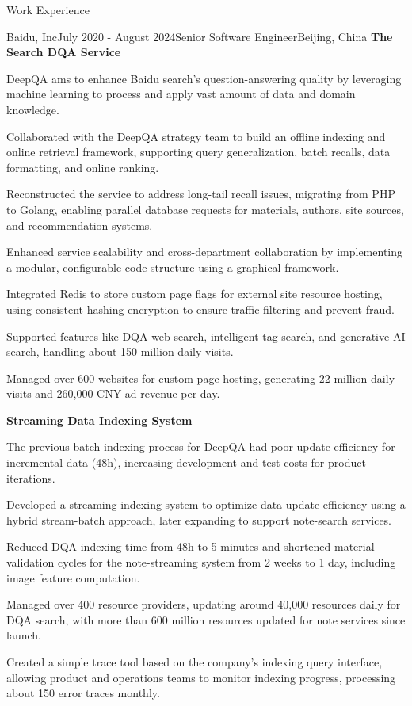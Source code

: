 \documentclass[
	11pt, %
]{resume} %
\begin{document}
\begin{rSection}{Work Experience}
\begin{rSubsection}{Baidu, Inc}{July 2020 - August 2024}{Senior Software Engineer}{Beijing, China}
    \textbf{The Search DQA Service}
        \item DeepQA ams to enhance Baidu search's question-answering quality by leveraging machine learning to process and apply vast amount of data and domain knowledge.
        \item Collaborated with the DeepQA strategy team to build an offline indexing and online retrieval framework, supporting query generalization, batch recalls, data formatting, and online ranking.
        \item Reconstructed the service to address long-tail recall issues, migrating from PHP to Golang, enabling parallel database requests for materials, authors, site sources, and recommendation systems.
        \item Enhanced service scalability and cross-department collaboration by implementing a modular, configurable code structure using a graphical framework.
        \item Integrated Redis to store custom page flags for external site resource hosting, using consistent hashing encryption to ensure traffic filtering and prevent fraud.
        \item Supported features like DQA web search, intelligent tag search, and generative AI search, handling about 150 million daily visits.
        \item Managed over 600 websites for custom page hosting, generating 22 million daily visits and 260,000 CNY ad revenue per day.

    \vspace{1ex}

    \textbf{Streaming Data Indexing System}
        \item The previous batch indexing process for DeepQA had poor update efficiency for incremental data (48h), increasing development and test costs for product iterations.
        \item Developed a streaming indexing system to optimize data update efficiency using a hybrid stream-batch approach, later expanding to support note-search services.
        \item Reduced DQA indexing time from 48h to 5 minutes and shortened material validation cycles for the note-streaming system from 2 weeks to 1 day, including image feature computation.
        \item Managed over 400 resource providers, updating around 40,000 resources daily for DQA search, with more than 600 million resources updated for note services since launch.
        \item Created a simple trace tool based on the company's indexing query interface, allowing product and operations teams to monitor indexing progress, processing about 150 error traces monthly.


\end{rSubsection}
\end{rSection}
\end{document}
